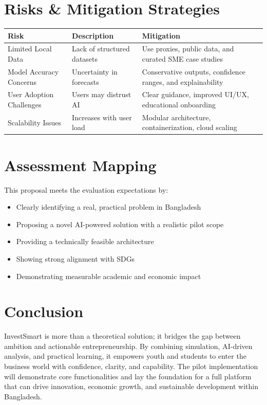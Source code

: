 \documentclass[12pt,letterpaper]{article}
\begin{document}
\section{Risks \& Mitigation Strategies}

\begin{longtable}{|p{3cm}|p{4cm}|p{6cm}|}
\hline
\textbf{Risk} & \textbf{Description} & \textbf{Mitigation} \\
\hline
Limited Local Data & Lack of structured datasets & Use proxies, public data, and curated SME case studies \\
\hline
Model Accuracy Concerns & Uncertainty in forecasts & Conservative outputs, confidence ranges, and explainability \\
\hline
User Adoption Challenges & Users may distrust AI & Clear guidance, improved UI/UX, educational onboarding \\
\hline
Scalability Issues & Increases with user load & Modular architecture, containerization, cloud scaling \\
\hline
\end{longtable}

\section{Assessment Mapping}
This proposal meets the evaluation expectations by:
\begin{itemize}
    \item Clearly identifying a real, practical problem in Bangladesh
    \item Proposing a novel AI-powered solution with a realistic pilot scope
    \item Providing a technically feasible architecture
    \item Showing strong alignment with SDGs
    \item Demonstrating measurable academic and economic impact
\end{itemize}

\section{Conclusion}
InvestSmart is more than a theoretical solution; it bridges the gap between ambition and actionable entrepreneurship. By combining simulation, AI-driven analysis, and practical learning, it empowers youth and students to enter the business world with confidence, clarity, and capability. The pilot implementation will demonstrate core functionalities and lay the foundation for a full platform that can drive innovation, economic growth, and sustainable development within Bangladesh.
\end{document}
